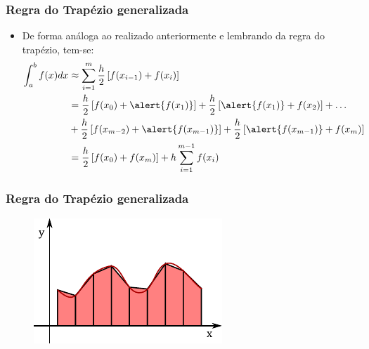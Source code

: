 \documentclass{beamer}
\theoremstyle{mystyle}
\begin{document}
\begin{frame}
	\frametitle{Regra do Trapézio generalizada}
	\begin{itemize}
		\item De forma análoga ao realizado anteriormente e lembrando da regra do trapézio, tem-se:
		\begin{align*}
			\int_{a}^{b}f(x)dx &\approx \sum_{i=1}^{m}\dfrac{h}{2}\left[ f(x_{i-1}) + f(x_{i})\right] \\
			&= \dfrac{h}{2}\left[ f(x_{0}) + \alert{f(x_{1})} \right] + \dfrac{h}{2}\left[ \alert{f(x_{1})} + f(x_{2}) \right] +\ldots\\
			&+ \dfrac{h}{2}\left[ f(x_{m-2}) + \alert{f(x_{m-1})} \right] + \dfrac{h}{2}\left[ \alert{f(x_{m-1})} + f(x_{m}) \right]\\
			& = \dfrac{h}{2}\left[ f(x_{0}) + f(x_{m}) \right] + h\sum_{i=1}^{m-1} f(x_{i}) 
		\end{align*}
	\end{itemize}
\end{frame}

\begin{frame}
	\frametitle{Regra do Trapézio generalizada}
	\begin{figure}
		\centering
		\includegraphics[width=0.8\linewidth]{Figuras/grafico_07}
		\label{fig:grafico07}
	\end{figure}
\end{frame}
\end{document}
